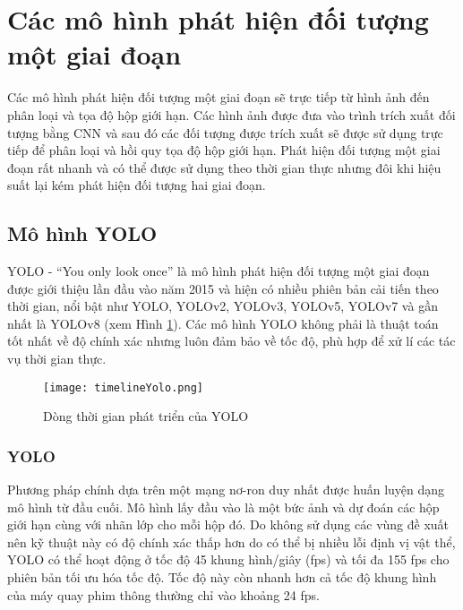 \documentclass[../the.tex]{subfiles}
\begin{document}
\section{Các mô hình phát hiện đối tượng một giai đoạn}
 {\fontsize{13}{12} \selectfont

  Các mô hình phát hiện đối tượng một giai đoạn sẽ trực tiếp từ hình ảnh đến phân loại và tọa độ hộp giới hạn.
  Các hình ảnh được đưa vào trình trích xuất đối tượng bằng CNN và sau đó các đối tượng được trích xuất sẽ được sử dụng trực tiếp để phân loại và hồi quy tọa độ hộp giới hạn.
  Phát hiện đối tượng một giai đoạn rất nhanh và có thể được sử dụng theo thời gian thực nhưng đôi khi hiệu suất lại kém phát hiện đối tượng hai giai đoạn.

 }
\subsection{Mô hình YOLO}

{\fontsize{13}{12} \selectfont

	YOLO - “You only look once” \cite{redmon2016look} là mô hình phát hiện đối tượng một giai đoạn được giới thiệu lần đầu vào năm 2015 và hiện có nhiều phiên bản cải tiến theo thời gian,
	nổi bật như YOLO, YOLOv2, YOLOv3, YOLOv5, YOLOv7 và gần nhất là YOLOv8 (xem Hình \ref{fig:timelimeyolo}). Các mô hình YOLO không phải là thuật toán tốt nhất về độ chính xác nhưng luôn đảm bảo về tốc độ, phù hợp để xử lí các tác vụ thời gian thực.

}

\begin{figure}[H]
	\centering
	\texttt{[image: timelineYolo.png]}
	\caption{Dòng thời gian phát triển của YOLO}
	\label{fig:timelimeyolo}
\end{figure}

\subsubsection{YOLO}
{\fontsize{13}{12} \selectfont

	Phương pháp chính dựa trên một mạng nơ-ron duy nhất được huấn luyện dạng mô hình từ đầu cuối.
	Mô hình lấy đầu vào là một bức ảnh và dự đoán các hộp giới hạn cùng với nhãn lớp cho mỗi hộp đó.
	Do không sử dụng các vùng đề xuất nên kỹ thuật này có độ chính xác thấp hơn do có thể bị nhiều lỗi định vị vật thể,
	YOLO có thể hoạt động ở tốc độ 45 khung hình/giây (fps) và tối đa 155 fps cho phiên bản tối ưu hóa tốc độ. Tốc độ này còn nhanh hơn cả tốc độ khung hình của máy quay phim thông thường chỉ vào khoảng 24 fps.

}
\end{document}
